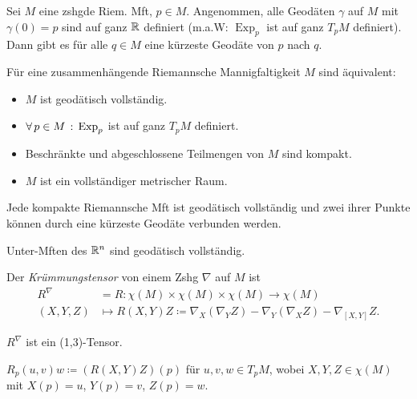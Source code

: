 \documentclass{cheat-sheet}
\DeclareMathOperator{\Exp}{Exp} %
\begin{document}

\begin{satz}
  Sei $M$ eine zshgde Riem. Mft, $p \in M$. Angenommen, alle Geodäten $\gamma$ auf $M$ mit $\gamma(0) = p$ sind auf ganz $\mathbb{R}$ definiert (m.a.W: $\Exp_p$ ist auf ganz $T_p M$ definiert). Dann gibt es für alle $q \in M$ eine kürzeste Geodäte von $p$ nach $q$.
\end{satz}

\begin{satz}
  Für eine zusammenhängende Riemannsche Mannigfaltigkeit $M$ sind äquivalent:
  \begin{itemize}
    \item $M$ ist geodätisch vollständig.
    \item $\fa{p \in M} \Exp_p$ ist auf ganz $T_p M$ definiert.
    \item Beschränkte und abgeschlossene Teilmengen von $M$ sind kompakt.
    \item $M$ ist ein vollständiger metrischer Raum.
  \end{itemize}
\end{satz}

\begin{kor}
  Jede kompakte Riemannsche Mft ist geodätisch vollständig und zwei ihrer Punkte können durch eine kürzeste Geodäte verbunden werden.
\end{kor}

\begin{kor}
  Unter-Mften des $\mathbb{R}^n$ sind geodätisch vollständig.
\end{kor}


\begin{defn}
  Der \emph{Krümmungstensor} von einem Zshg $\nabla$ auf $M$ ist
  \begin{align*}
    R^{\nabla} & = R : \chi(M) \times \chi(M) \times \chi(M) \to \chi(M) \\
    (X, Y, Z) & \mapsto R(X, Y)Z \coloneqq \nabla_X (\nabla_Y Z) - \nabla_Y (\nabla_X Z) - \nabla_{[X, Y]} Z.
  \end{align*}
\end{defn}

\begin{bem}
  $R^\nabla$ ist ein (1,3)-Tensor.
\end{bem}

\begin{nota}
  $R_p(u, v)w \coloneqq (R(X, Y)Z)(p)$ für $u, v, w \in T_p M$, wobei $X, Y, Z \in \chi(M)$ mit $X(p) \!=\! u$, $Y(p) \!=\! v$, $Z(p) \!=\! w$.
\end{nota}
\end{document}
